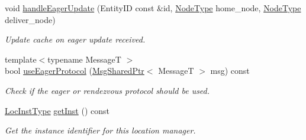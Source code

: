 \begin{DoxyCompactItemize}
void \hyperlink{structvt_1_1location_1_1_entity_location_coord_a02337c5b5c23bf81b540568107103ef4}{handle\+Eager\+Update} (Entity\+ID const \&id, \hyperlink{namespacevt_a866da9d0efc19c0a1ce79e9e492f47e2}{Node\+Type} home\+\_\+node, \hyperlink{namespacevt_a866da9d0efc19c0a1ce79e9e492f47e2}{Node\+Type} deliver\+\_\+node)
\begin{DoxyCompactList}\small\item\em Update cache on eager update received. \end{DoxyCompactList}\item 
{\footnotesize template$<$typename MessageT $>$ }\\bool \hyperlink{structvt_1_1location_1_1_entity_location_coord_a5d41b90c998e6de566868868c9cc4ba1}{use\+Eager\+Protocol} (\hyperlink{namespacevt_ab2b3d506ec8e8d1540aede826d84a239}{Msg\+Shared\+Ptr}$<$ MessageT $>$ msg) const
\begin{DoxyCompactList}\small\item\em Check if the eager or rendezvous protocol should be used. \end{DoxyCompactList}\item 
\hyperlink{namespacevt_1_1location_a4db6456e8024af2d23fc5ae560fef866}{Loc\+Inst\+Type} \hyperlink{structvt_1_1location_1_1_entity_location_coord_abff79ccad9dcd168217f99ee97048beb}{get\+Inst} () const
\begin{DoxyCompactList}\small\item\em Get the instance identifier for this location manager. \end{DoxyCompactList}\end{DoxyCompactItemize}
